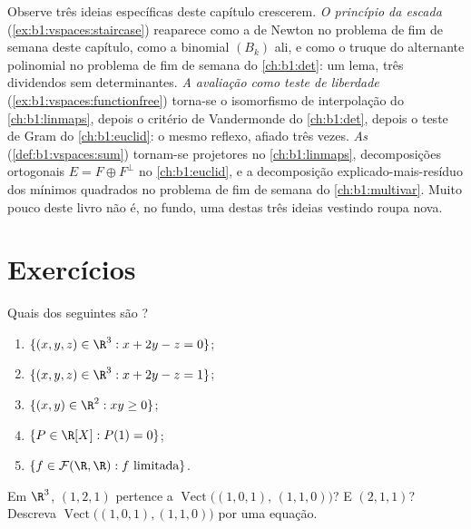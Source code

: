 \begin{remark}
\label{rem:b1:vspaces:threads}
Observe três ideias específicas deste capítulo crescerem.
\emph{O princípio da escada}
(\cref{ex:b1:vspaces:staircase}) reaparece como a  de Newton
no problema de fim de semana deste capítulo, como a  binomial
$(B_k)$ ali, e como o truque do alternante polinomial no problema de
fim de semana do \cref{ch:b1:det}: um lema, três dividendos sem determinantes.
\emph{A avaliação como teste de liberdade}
(\cref{ex:b1:vspaces:functionfree}) torna-se o isomorfismo de interpolação do \cref{ch:b1:linmaps}, depois o
critério de Vandermonde do \cref{ch:b1:det}, depois o teste de Gram do
\cref{ch:b1:euclid}: o mesmo reflexo, afiado três vezes.
\emph{As } (\cref{def:b1:vspaces:sum}) tornam-se projetores no \cref{ch:b1:linmaps},
decomposições ortogonais $E =
F \oplus F^\perp$ no \cref{ch:b1:euclid}, e a decomposição
explicado-mais-resíduo dos mínimos quadrados no problema de fim de
semana do \cref{ch:b1:multivar}. Muito pouco deste livro não é, no fundo, uma
destas três ideias vestindo roupa nova.
\end{remark}

\section{Exercícios}

\begin{exercise}[$\star$]\label{exo:b1:vspaces:1}
Quais dos seguintes são ?
\begin{enumerate}
  \item $\{(x, y, z) \in \R^3 : x + 2y - z = 0\}$;
  \item $\{(x, y, z) \in \R^3 : x + 2y - z = 1\}$;
  \item $\{(x, y) \in \R^2 : xy \geq 0\}$;
  \item $\{P \in \R[X] : P(1) = 0\}$;
  \item $\{f \in \mathcal{F}(\R,\R) : f \text{ limitada}\}$.
\end{enumerate}
\end{exercise}

\begin{exercise}[$\star$]\label{exo:b1:vspaces:2}
Em $\R^3$, $(1, 2, 1)$ pertence a
$\operatorname{Vect}\bigl((1,0,1),\, (1,1,0)\bigr)$? E $(2, 1,
1)$? Descreva $\operatorname{Vect}\bigl((1,0,1),(1,1,0)\bigr)$ por uma equação.
\end{exercise}

